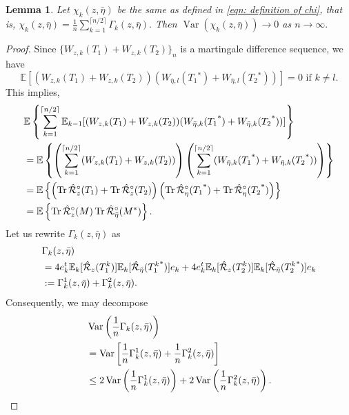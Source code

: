 \documentclass[12pt]{amsart}
\theoremstyle{plain}
\newtheorem{lemma}[Thm]{Lemma}
\theoremstyle{definition}
\newcommand{\conjugate}{{\operatorname{^*}}}
\newcommand{\Tr}{\operatorname{Tr}}
\newcommand{\Var}{\operatorname{Var}}
\begin{document}
\begin{lemma}
    Let $\chi_{k}(z, \bar{\eta})$ be the same as defined in \eqref{eqn: definition of chi}, that is, $\chi_{k}(z, \bar{\eta}) = \frac{1}{n}\sum _{k=1}^{\lceil n/2 \rceil}\Gamma_{k}(z,\bar{\eta}).$ Then $\Var(\chi_{k}(z, \bar\eta))\to 0$ as $n\to\infty.$
\end{lemma}

\begin{proof}
Since $\{W_{z,k}(T_1)+W_{z,k}(T_2)\}_n$ is a martingale difference sequence, we have 
$$ 
\mathbb{E}[(W_{z,k}(T_1)+W_{z,k}(T_2))(W_{\bar{\eta},l}(T_1\conjugate)+W_{\bar{\eta},l}(T_2\conjugate))]=0 \text{ if } k \neq l. $$
This implies,
\begin{align}
    &\mathbb{E}\left\{\sum_{k=1}^{\lceil n/2 \rceil}\mathbb{E}_{k-1}[(W_{z,k}(T_1)+W_{z,k}(T_2))(W_{\bar{\eta},k}(T_1\conjugate)+W_{\bar{\eta},k}(T_2\conjugate))]\right\}\notag\\
    &= \mathbb{E}\left\{\left(\sum_{k=1}^{\lceil n/2 \rceil}(W_{z,k}(T_1)+W_{z,k}(T_2))\right)\left(\sum_{k=1}^{\lceil n/2 \rceil}(W_{\bar{\eta},k}(T_1\conjugate)+W_{\bar{\eta},k}(T_2\conjugate))\right)\right\}\notag\\
    &= \mathbb{E}\left\{\left(\Tr \hat{\mathcal{R}}_z^{\circ}(T_1)+\Tr \hat{\mathcal{R}}_z^{\circ}(T_2)\right)\left(\Tr \hat{\mathcal{R}}_\eta^{\circ}(T_1\conjugate)+\Tr \hat{\mathcal{R}}_\eta^{\circ}(T_2\conjugate)\right)\right\}\notag\\
    &= \mathbb{E}\left\{\Tr \hat{\mathcal{R}}_z^{\circ}(M) \Tr \hat{\mathcal{R}}_{\bar{\eta}}^{\circ}(M^*)\right\}.\notag
\end{align}
Let us rewrite $\Gamma_{k}(z,\bar{\eta})$ as
\begin{align}
    &\Gamma_{k}(z,\bar{\eta})\notag\\
    &=4e_k^t \mathbb{E}_k [\hat{\mathcal{R}}_{z}(T_1^k)]\mathbb{E}_k [\hat{\mathcal{R}}_{\bar{\eta}}(T_1^k\conjugate)]e_k+4e_k^t \mathbb{E}_k [\hat{\mathcal{R}}_{z}(T_2^k)]\mathbb{E}_k [\hat{\mathcal{R}}_{\bar{\eta}}(T_2^k\conjugate)]e_k\notag\\
    &:= \Gamma_{k}^1(z,\bar{\eta})+\Gamma_{k}^2(z,\bar{\eta}).\notag
\end{align}
Consequently, we may decompose
\begin{align}
    &\Var\left(\frac{1}{n}\Gamma_{k}(z,\bar{\eta})\right)\notag\\
    &=\Var\left[\frac{1}{n}\Gamma_{k}^1(z,\bar{\eta})+\frac{1}{n}\Gamma_{k}^2(z,\bar{\eta})\right] \notag\\
    &\leq 2\Var\left(\frac{1}{n}\Gamma_{k}^1(z,\bar{\eta})\right)+2\Var\left(\frac{1}{n}\Gamma_{k}^2(z,\bar{\eta})\right). \notag

\end{align}
\end{proof}
\end{document}
